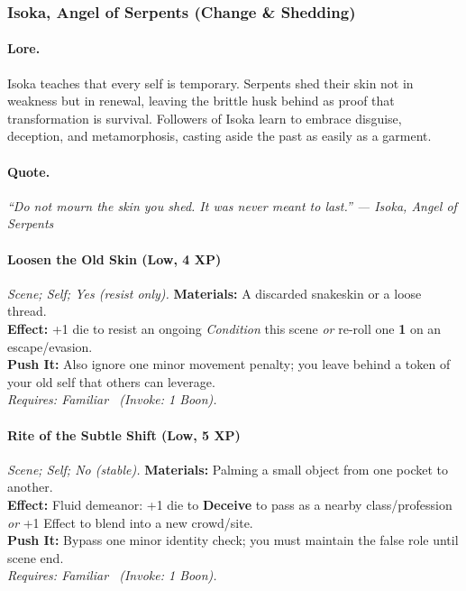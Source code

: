 \subsubsection{Isoka, Angel of Serpents (Change \& Shedding)}

\paragraph{Lore.} 
Isoka teaches that every self is temporary. Serpents shed their skin not in weakness but in renewal, leaving the brittle husk behind as proof that transformation is survival. Followers of Isoka learn to embrace disguise, deception, and metamorphosis, casting aside the past as easily as a garment.

\paragraph{Quote.}
\emph{“Do not mourn the skin you shed. It was never meant to last.” — Isoka, Angel of Serpents}

\paragraph{Loosen the Old Skin (Low, 4 XP)} \emph{Scene; Self; Yes (resist only).}
\textbf{Materials:} A discarded snakeskin or a loose thread. \\
\textbf{Effect:} +1 die to resist an ongoing \emph{Condition} this scene \emph{or} re-roll one \textbf{1} on an escape/evasion. \\
\textbf{Push It:} Also ignore one minor movement penalty; you leave behind a token of your old self that others can leverage. \\
\emph{Requires: Familiar \ (\textit{Invoke:} 1 Boon).}

\paragraph{Rite of the Subtle Shift (Low, 5 XP)} \emph{Scene; Self; No (stable).}
\textbf{Materials:} Palming a small object from one pocket to another. \\
\textbf{Effect:} Fluid demeanor: +1 die to \textbf{Deceive} to pass as a nearby class/profession \emph{or} +1 Effect to blend into a new crowd/site. \\
\textbf{Push It:} Bypass one minor identity check; you must maintain the false role until scene end. \\
\emph{Requires: Familiar \ (\textit{Invoke:} 1 Boon).}

